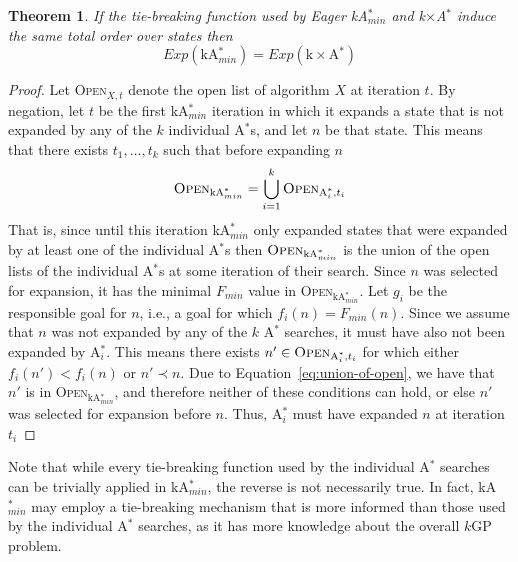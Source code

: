 \documentclass{aicom2e}
\newtheorem{theorem}{Theorem}
\newcommand{\kgs}{$k$GP}
\newcommand{\astar}{A$^*$}
\newcommand{\kastarmin}{kA$^*_{min}$}
\newcommand{\kxastar}{k$\times$A$^*$}
\newcommand{\astari}[1]{A$^*_#1$}
\newcommand{\open}{\textsc{Open}}
\begin{document}
\begin{theorem}
    If the tie-breaking function used by Eager \kastarmin{} and \kxastar{}
    induce the same total order over states then
    \[Exp(\text{\kastarmin{}})=Exp(\text{\kxastar{}}) \]
    \label{the:expanded-equal}
\end{theorem}
\begin{proof}
    Let \open$_{X,t}$ denote the open list of algorithm $X$ at iteration $t$. 
    By negation, let $t$ be the first \kastarmin{} iteration in which it expands
    a state that is not expanded by any of the $k$ individual \astar{}s, and let $n$ be that state. This means that there exists $t_1,\ldots,t_k$ such that before expanding $n$
    \begin{equation}
    \open{}_{\text{\kastarmin{}}}=\bigcup_{i=1}^k \open_{\text{\astari{i}},t_i}
    \label{eq:union-of-open}
    \end{equation}
    That is, since until this iteration \kastarmin{} only expanded states 
    that were expanded by at least one of the individual \astar{}s then 
    $\open{}_{\text{\kastarmin{}}}$ is the union of the open lists of the individual \astar{}s
    at some iteration of their search. 
    Since $n$ was selected for expansion, it has the minimal $F_{min}$ value
in \open{}$_{\text{\kastarmin{}}}$. Let $g_i$ be the responsible goal for $n$,
i.e., a goal for which $f_i(n)=F_{min}(n)$.
Since we assume that $n$ was not expanded by any of the $k$
\astar{} searches, it must have also not been expanded by \astari{i}.
This means there exists $n'\in\open_{\text{\astari{i}},t_i}$ for which either $f_i(n')<f_i(n)$
or $n'\prec n$. Due to Equation~\ref{eq:union-of-open}, we have that $n'$ is in \open{}$_{\text{\kastarmin{}}}$,
and therefore neither of these conditions can hold, or else $n'$ was selected for expansion before $n$. Thus, \astari{i} must have expanded $n$ at iteration $t_i$
\end{proof}
Note that while every tie-breaking function used by the individual \astar{} searches 
can be trivially applied in \kastarmin{}, the reverse is not necessarily true. In fact, \kastarmin{} may employ a tie-breaking mechanism that is more informed 
than those used by the individual \astar{} searches, as it has more knowledge about the overall \kgs{} problem. 


\end{document}
